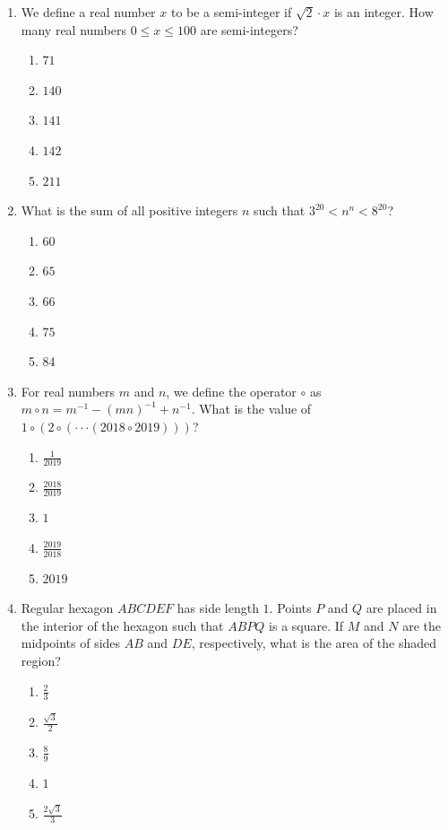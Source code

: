 \documentclass[12pt]{scrartcl}
\begin{document}
\begin{enumerate}
\item We define a real number $x$ to be a semi-integer if $\sqrt{2}\cdot x$ is an integer. How many real numbers $0\le x\le100$ are semi-integers?
\begin{enumerate}
    \item $71$
    \item $140$
    \item $141$
    \item $142$
    \item $211$
\end{enumerate}

\item What is the sum of all positive integers $n$ such that $3^{20}<n^{n}<8^{20}$?
\begin{enumerate}
    \item $60$
    \item $65$
    \item $66$
    \item $75$
    \item $84$
\end{enumerate}

\item For real numbers $m$ and $n$, we define the operator $\circ$ as $m\circ n = m^{-1}-(mn)^{-1}+n^{-1}$. What is the value of $1\circ(2\circ(\cdot\cdot\cdot(2018\circ2019)))$?
\begin{enumerate}
    \item $\frac{1}{2019}$
    \item $\frac{2018}{2019}$
    \item $1$
    \item $\frac{2019}{2018}$
    \item $2019$
\end{enumerate}

\item Regular hexagon $ABCDEF$ has side length $1$. Points $P$ and $Q$ are placed in the interior of the hexagon such that $ABPQ$ is a square. If $M$ and $N$ are the midpoints of sides $AB$ and $DE$, respectively, what is the area of the shaded region?
\begin{enumerate}
    \item $\frac{2}{3}$
    \item $\frac{\sqrt{3}}{2}$
    \item $\frac{8}{9}$
    \item $1$
    \item $\frac{2\sqrt{3}}{3}$
\end{enumerate}


\end{enumerate}
\end{document}
